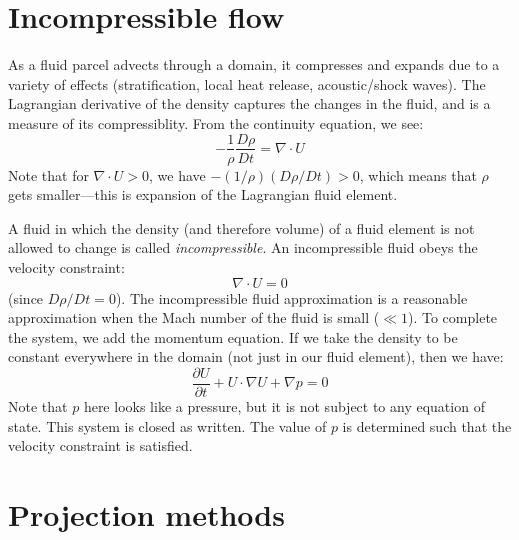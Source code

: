 \begin{quote}
\end{quote}

\section{Incompressible flow}

As a fluid parcel advects through a domain, it compresses and expands
due to a variety of effects (stratification, local heat release,
acoustic/shock waves).  The Lagrangian derivative of the density
captures the changes in the fluid, and is a measure of its compressiblity.
From the continuity equation, we see:
\begin{equation}
-\frac{1}{\rho}\frac{D\rho}{Dt} = \nabla \cdot U
\end{equation}
Note that for $\nabla \cdot U > 0$, we have $-(1/\rho) (D\rho/Dt) > 0$,
which means that $\rho$ gets smaller---this is expansion of the Lagrangian
fluid element.

A fluid in which the density (and therefore volume) of a fluid element is not
allowed to change is called {\em incompressible}.  An incompressible
fluid obeys the velocity constraint:
\begin{equation}
\nabla \cdot U = 0
\end{equation}
(since $D\rho / Dt = 0$).  The incompressible fluid approximation is 
a reasonable approximation when the Mach number of the fluid is small
($\ll 1$).  To complete the system, we add the momentum equation.  If 
we take the density to be constant everywhere in the domain (not just
in our fluid element), then we have:
\begin{equation}
\frac{\partial U}{\partial t} + U \cdot \nabla U + \nabla p = 0
\end{equation}
Note that $p$ here looks like a pressure, but it is not subject to
any equation of state.  This system is closed as written.  The value
of $p$ is determined such that the velocity constraint is satisfied.



\section{Projection methods}


